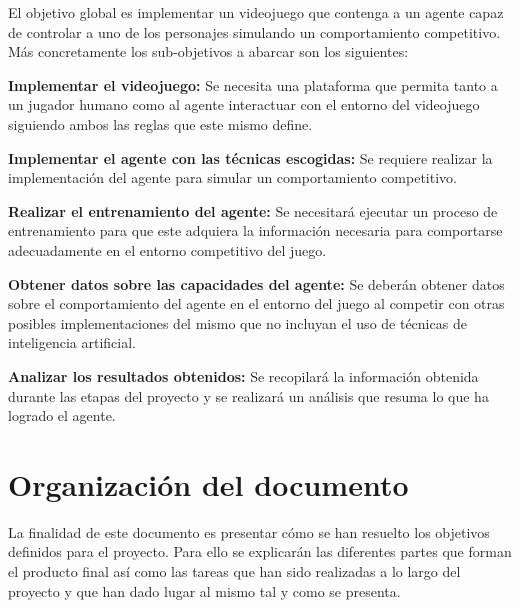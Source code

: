 El objetivo global es implementar un videojuego que contenga a un agente capaz de controlar a uno de los personajes simulando un comportamiento competitivo. Más concretamente los sub-objetivos a abarcar son los siguientes:

\begin{enumerate}
	
	{\item {\bf Implementar el videojuego:}
		Se necesita una plataforma que permita tanto a un jugador humano como al agente interactuar con el entorno del videojuego siguiendo ambos las reglas que este mismo define.
	}

	{\item {\bf Implementar el agente con las técnicas escogidas:}
		Se requiere realizar la implementación del agente para simular un comportamiento competitivo.
	}

	{\item {\bf Realizar el entrenamiento del agente:}
		Se necesitará ejecutar un proceso de entrenamiento para que este adquiera la información necesaria para comportarse adecuadamente en el entorno competitivo del juego.
	}

	{\item {\bf Obtener datos sobre las capacidades del agente:}
		Se deberán obtener datos sobre el comportamiento del agente en el entorno del juego al competir con otras posibles implementaciones del mismo que no incluyan el uso de técnicas de inteligencia artificial.
	}

	{\item {\bf Analizar los resultados obtenidos:}
		Se recopilará la información obtenida durante las etapas del proyecto y se realizará un análisis que resuma lo que ha logrado el agente.
	}
	
\end{enumerate}

\section{Organización del documento}

La finalidad de este documento es presentar cómo se han resuelto los objetivos definidos para el proyecto. Para ello se explicarán las diferentes partes que forman el producto final así como las tareas que han sido realizadas a lo largo del proyecto y que han dado lugar al mismo tal y como se presenta.


